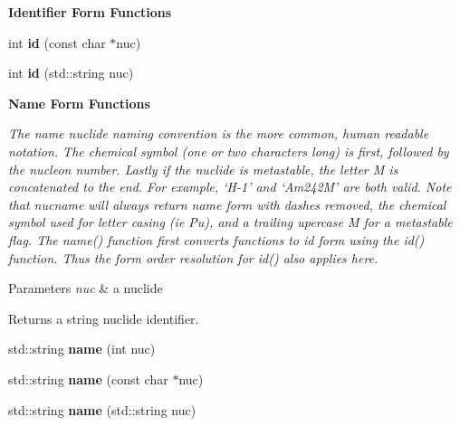 \begin{Indent}{\bf Identifier Form Functions}
\begin{DoxyCompactItemize}
\item 
int {\bfseries id} (const char $\ast$nuc)\hypertarget{namespacepyne_1_1nucname_aeae6e6349d1ebe44ae449ce485070492}{}\label{namespacepyne_1_1nucname_aeae6e6349d1ebe44ae449ce485070492}

\item 
int {\bfseries id} (std\+::string nuc)\hypertarget{namespacepyne_1_1nucname_aba028a16fcfaeb10e45bb5218606a17e}{}\label{namespacepyne_1_1nucname_aba028a16fcfaeb10e45bb5218606a17e}

\end{DoxyCompactItemize}
\end{Indent}
\begin{Indent}{\bf Name Form Functions}\par
{\em The \textquotesingle{}name\textquotesingle{} nuclide naming convention is the more common, human readable notation. The chemical symbol (one or two characters long) is first, followed by the nucleon number. Lastly if the nuclide is metastable, the letter M is concatenated to the end. For example, ‘\+H-\/1’ and ‘\+Am242\+M’ are both valid. Note that nucname will always return name form with dashes removed, the chemical symbol used for letter casing (ie \textquotesingle{}Pu\textquotesingle{}), and a trailing upercase \textquotesingle{}M\textquotesingle{} for a metastable flag. The name() function first converts functions to id form using the id() function. Thus the form order resolution for id() also applies here. 
\begin{DoxyParams}{Parameters}
{\em nuc} & a nuclide \\
\hline
\end{DoxyParams}
\begin{DoxyReturn}{Returns}
a string nuclide identifier. 
\end{DoxyReturn}
}\begin{DoxyCompactItemize}
\item 
std\+::string {\bfseries name} (int nuc)\hypertarget{namespacepyne_1_1nucname_a70117a5d74d65b210c635c662e08fe10}{}\label{namespacepyne_1_1nucname_a70117a5d74d65b210c635c662e08fe10}

\item 
std\+::string {\bfseries name} (const char $\ast$nuc)\hypertarget{namespacepyne_1_1nucname_a75738980b674158abff6ea0c60d0900f}{}\label{namespacepyne_1_1nucname_a75738980b674158abff6ea0c60d0900f}

\item 
std\+::string {\bfseries name} (std\+::string nuc)\hypertarget{namespacepyne_1_1nucname_adfcf9a3fc2217ba23e93ce5915bad706}{}\label{namespacepyne_1_1nucname_adfcf9a3fc2217ba23e93ce5915bad706}

\end{DoxyCompactItemize}
\end{Indent}
